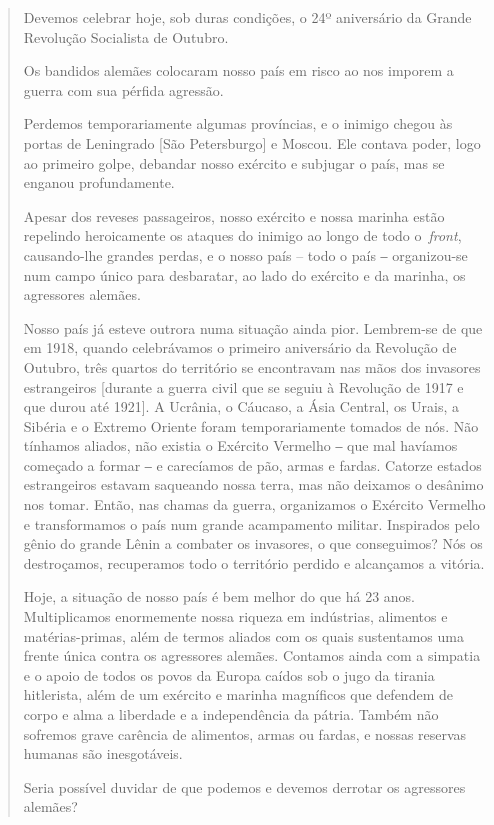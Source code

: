 \begin{quote}
Devemos celebrar hoje, sob duras condições, o 24º aniversário da Grande
Revolução Socialista de Outubro.

Os bandidos alemães colocaram nosso país em risco ao nos imporem a
guerra com sua pérfida agressão.

Perdemos temporariamente algumas províncias, e o inimigo chegou às
portas de Leningrado {[}São Petersburgo{]} e Moscou. Ele contava poder,
logo ao primeiro golpe, debandar nosso exército e subjugar o país, mas
se enganou profundamente.

Apesar dos reveses passageiros, nosso exército e nossa marinha estão
repelindo heroicamente os ataques do inimigo ao longo de todo
o~\emph{front}, causando-lhe grandes perdas, e o nosso país -- todo o
país ‒ organizou-se num campo único para desbaratar, ao lado do exército
e da marinha, os agressores alemães.

Nosso país já esteve outrora numa situação ainda pior. Lembrem-se de que
em 1918, quando celebrávamos o primeiro aniversário da Revolução de
Outubro, três quartos do território se encontravam nas mãos dos
invasores estrangeiros {[}durante a guerra civil que se seguiu à
Revolução de 1917 e que durou até 1921{]}. A Ucrânia, o Cáucaso, a Ásia
Central, os Urais, a Sibéria e o Extremo Oriente foram temporariamente
tomados de nós. Não tínhamos aliados, não existia o Exército Vermelho ‒
que mal havíamos começado a formar ‒ e carecíamos de pão, armas e
fardas. Catorze estados estrangeiros estavam saqueando nossa terra, mas
não deixamos o desânimo nos tomar. Então, nas chamas da guerra,
organizamos o Exército Vermelho e transformamos o país num grande
acampamento militar. Inspirados pelo gênio do grande Lênin a combater os
invasores, o que conseguimos? Nós os destroçamos, recuperamos todo o
território perdido e alcançamos a vitória.

Hoje, a situação de nosso país é bem melhor do que há 23 anos.
Multiplicamos enormemente nossa riqueza em indústrias, alimentos e
matérias-primas, além de termos aliados com os quais sustentamos uma
frente única contra os agressores alemães. Contamos ainda com a simpatia
e o apoio de todos os povos da Europa caídos sob o jugo da tirania
hitlerista, além de um exército e marinha magníficos que defendem de
corpo e alma a liberdade e a independência da pátria. Também não
sofremos grave carência de alimentos, armas ou fardas, e nossas reservas
humanas são inesgotáveis.

Seria possível duvidar de que podemos e devemos derrotar os agressores
alemães?


\end{quote}
